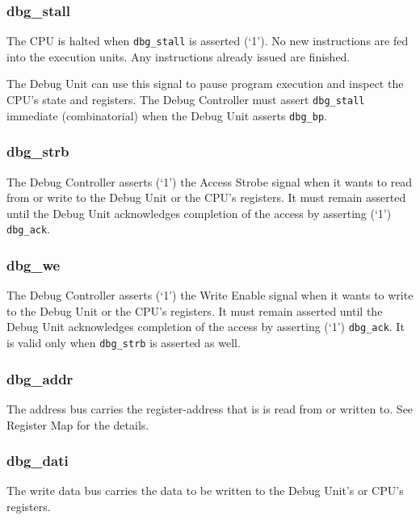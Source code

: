 \subsubsection{dbg\_stall}\label{dbg_stall}

The CPU is halted when \texttt{dbg\_stall} is asserted (`1'). No new instructions
are fed into the execution units. Any instructions already issued are
finished.

The Debug Unit can use this signal to pause program execution and
inspect the CPU's state and registers. The Debug Controller must assert
\texttt{dbg\_stall} immediate (combinatorial) when the Debug Unit asserts
\texttt{dbg\_bp}.

\subsubsection{dbg\_strb}\label{dbg_strb}

The Debug Controller asserts (`1') the Access Strobe signal when it
wants to read from or write to the Debug Unit or the CPU's registers. It
must remain asserted until the Debug Unit acknowledges completion of the
access by asserting (`1') \texttt{dbg\_ack}.

\subsubsection{dbg\_we}\label{dbg_we}

The Debug Controller asserts (`1') the Write Enable signal when it wants
to write to the Debug Unit or the CPU's registers. It must remain
asserted until the Debug Unit acknowledges completion of the access by
asserting (`1') \texttt{dbg\_ack}. It is valid only when \texttt{dbg\_strb} is asserted as
well.

\subsubsection{dbg\_addr}\label{dbg_addr}

The address bus carries the register-address that is is read from or
written to. See Register Map for the details.

\subsubsection{dbg\_dati}\label{dbg_dati}

The write data bus carries the data to be written to the Debug Unit's or
CPU's registers.

